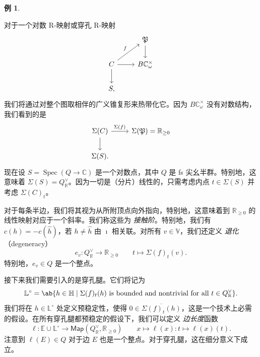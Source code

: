 \documentclass{amsart}
\theoremstyle{definition}
\newtheorem{exm}[thm]{例}
\theoremstyle{remark}
\theoremstyle{plain}
\theoremstyle{definition}
\theoremstyle{remark}
\newcommand{\R}{\mathbb{R}}
\newcommand{\C}{\mathbb{C}}
\newcommand{\E}{\mathbb{E}}
\newcommand{\V}{\mathbb{V}}
\renewcommand{\H}{\mathbb{H}}
\renewcommand{\L}{\mathbb{L}}
\newcommand{\mf}[1]{\mathfrak{#1}}
\newcommand{\ms}[1]{\mathsf{#1}}
\newcommand{\ol}[1]{\overline{#1}}
\newcommand{\1}{\mathbf{1}}
\newcommand{\2}{\mathbf{2}}
\newcommand{\3}{\mathbf{3}}
\DeclareMathOperator{\Spec}{Spec}
\begin{document}
\begin{exm}
\begin{center}
    \end{center}
\end{exm}

对于一个对数 R-映射或穿孔 R-映射
\begin{equation*}
\begin{tikzcd}
    & \mf{P} \ar{d} \\
    C \ar{ur}{f} \ar{d} \ar{r} & B \C_{\omega}^{\times} \\
    S,
\end{tikzcd}
\end{equation*}
我们将通过对整个图取相伴的广义锥复形来热带化它。因为 \(B \C_{\omega}^{\times}\) 没有对数结构，我们看到的是
\begin{equation*}
\begin{tikzcd}
    \Sigma(C) \ar{d} \ar{r}{\Sigma(f)} & \Sigma(\mf{P}) = \R_{\geq 0} \\
    \Sigma(S).
\end{tikzcd}
\end{equation*}
现在设 \(S = \Spec (Q \to \C)\) 是一个对数点，其中 \(Q\) 是 fs 尖幺半群。特别地，这意味着 \(\Sigma(S) = Q_{\R}^{\vee}\)。因为一切是（分片）线性的，只需考虑内点 \(t \in \Sigma(S)\) 并考虑 \(\Sigma(C)_t\)。

对于每条半边，我们将其视为从所附顶点向外指向，特别地，这意味着到 \(\R_{\geq 0}\) 的线性映射对应于一个斜率。我们称这些为 \textit{接触阶}。特别地，我们有 \(c(h) = - c(\hat{h})\)，若 \(h \neq \hat{h}\) 由 \(\imath\) 相关联。对所有 \(v \in \V\)，我们还定义 \textit{退化}（degeneracy）
\[ e_v \colon Q_{\R}^{\vee} \to \R_{\geq 0} \qquad t \mapsto \Sigma(f)_t (v). \]
特别地，\(e_v \in Q\) 是一个整点。

接下来我们需要引入的是穿孔腿。它们将记为
\[ \L^{\circ} = \ab\{ h \in \H \mid \Sigma(f)_t(h) \text{ is bounded and nontrivial for all } t \in Q_{\R}^{\vee}\}. \] 
我们将在 \(h \in \L^{\circ}\) 处定义预稳定性，使得 \(0 \in \ol{\Sigma(f)_t(h)}\)，这是一个技术上必需的假设。在所有穿孔腿都预稳定的假设下，我们可以定义 \textit{边长度}函数
\[ \ell \colon \E \cup \L^{\circ} \to \ms{Map}(Q_{\R}^{\vee}, \R_{\geq 0}) \qquad x \mapsto \ell(x) \colon t \mapsto \ell(x)(t). \]
注意到 \(\ell(E) \in Q\) 对于边 \(E\) 也是一个整点。对于穿孔腿，这在细分意义下成立。
\end{document}
